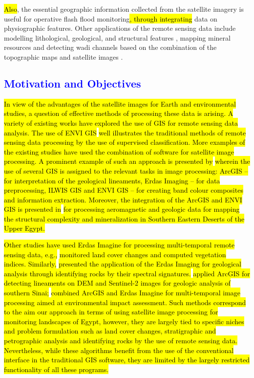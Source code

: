 \documentclass[information,article,submit,pdftex,moreauthors]{Definitions/mdpi}
\begin{document}
\hl{Also}, the essential geographic information collected from the satellite imagery is useful for operative flash flood monitoring\hl{, through integrating } data on physiographic features. Other applications of the remote sensing data include modelling lithological, geological, and structural features \cite{BESHR2021999}, mapping mineral resources \cite{Kamal} and detecting wadi channels based on the combination of the topographic maps and satellite images \cite{Moubark}. 

\subsection{\textcolor{blue}{Motivation and Objectives}}

\hl{In view of the advantages of the satellite images for Earth and environmental studies, a question of effective methods of processing these data is arising. A variety of existing works have explored the use of GIS for remote sensing data analysis. The use of ENVI GIS} \cite{ABDELSADEK2022815,GHEBREZGABHER201637,ABDELMALIK2020263} \hl{well illustrates the traditional methods of remote sensing data processing by the use of supervised classification. More examples of the existing studies have used the combination of software for satellite image processing. A prominent example of such an approach is presented by} \cite{KAMEL2016343} \hl{wherein the use of several GIS is assigned to the relevant tasks in image processing: ArcGIS -- for interpretation of the geological lineaments, Erdas Imaging -- for data preprocessing, ILWIS GIS and ENVI GIS -- for creating band colour composites and information extraction. Moreover, the integration of the ArcGIS and ENVI GIS is presented in} \cite{ELDOSOUKY20201008,GABR202211} \hl{for processing aeromagnetic and geologic data for mapping the structural complexity and mineralization in Southern Eastern Deserts of the Upper Egypt.}

\hl{Other studies have used Erdas Imagine for processing multi-temporal remote sensing data, e.g.,} \cite{BAKR2010592,NASSERMOHAMEDEID202066} \hl{monitored land cover changes and computed vegetation indices. Similarly,} \cite{ALIBIK2022113} \hl{presented the application of the Erdas Imaging for geological analysis through identifying rocks by their spectral signatures.} \cite{ALIBIK2022593} \hl{applied ArcGIS for detecting lineaments on DEM and Sentinel-2 images for geologic analysis of southern Sinai;} \cite{HOSSEN2016951} \hl{combined ArcGIS and Erdas Imagine for multi-temporal image processing aimed at environmental impact assessment. Such methods correspond to the aim our approach in terms of using satellite image processing for monitoring landscapes of Egypt, however, they are largely tied to specific niches and problem formulation such as land cover changes, stratigraphic and petrographic analysis and identifying rocks by the use of remote sensing data. Nevertheless, while these algorithms benefit from the use of the conventional interface in the traditional GIS software, they are limited by the largely restricted functionality of all these programs. }
\end{document}
